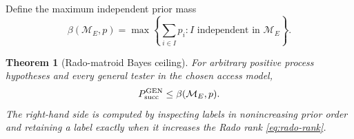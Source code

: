\documentclass[11pt]{article}
\newtheorem{theorem}{Theorem}[section]
\theoremstyle{definition}
\theoremstyle{remark}
\newcommand{\cM}{\mathcal M}
\begin{document}
Define the maximum independent prior mass
\begin{equation}
 \beta(\cM_E,p)=
 \max\left\{\sum_{i\in I}p_i:I\text{ independent in }\cM_E\right\}.
                                                               \label{eq:beta}
\end{equation}

\begin{theorem}[Rado-matroid Bayes ceiling]\label{thm:main}
For arbitrary positive process hypotheses and every general tester in the
chosen access model,
\begin{equation}
                 P_{\rm succ}^{\rm GEN}\leq\beta(\cM_E,p).     \label{eq:main}
\end{equation}
The right-hand side is computed by inspecting labels in nonincreasing prior
order and retaining a label exactly when it increases the Rado rank
\cref{eq:rado-rank}.
\end{theorem}
\end{document}
